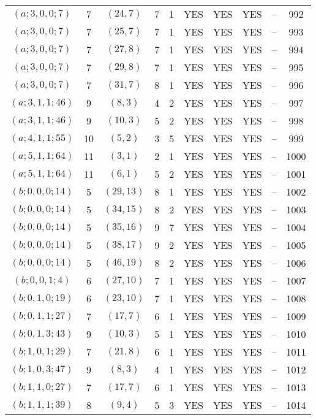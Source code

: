 \begin{longtable}{|c|c|c|c|c|c|c|c|c|c|}
$(a; 3, 0, 0; 7)$ & 7 & $(24, 7)$ & 7 & 1 & YES & YES & YES & -- & 992\\
$(a; 3, 0, 0; 7)$ & 7 & $(25, 7)$ & 7 & 1 & YES & YES & YES & -- & 993\\
$(a; 3, 0, 0; 7)$ & 7 & $(27, 8)$ & 7 & 1 & YES & YES & YES & -- & 994\\
$(a; 3, 0, 0; 7)$ & 7 & $(29, 8)$ & 7 & 1 & YES & YES & YES & -- & 995\\
$(a; 3, 0, 0; 7)$ & 7 & $(31, 7)$ & 8 & 1 & YES & YES & YES & -- & 996\\
$(a; 3, 1, 1; 46)$ & 9 & $(8, 3)$ & 4 & 2 & YES & YES & YES & -- & 997\\
$(a; 3, 1, 1; 46)$ & 9 & $(10, 3)$ & 5 & 2 & YES & YES & YES & -- & 998\\
$(a; 4, 1, 1; 55)$ & 10 & $(5, 2)$ & 3 & 5 & YES & YES & YES & -- & 999\\
$(a; 5, 1, 1; 64)$ & 11 & $(3, 1)$ & 2 & 1 & YES & YES & YES & -- & 1000\\
$(a; 5, 1, 1; 64)$ & 11 & $(6, 1)$ & 5 & 2 & YES & YES & YES & -- & 1001\\
$(b; 0, 0, 0; 14)$ & 5 & $(29, 13)$ & 8 & 1 & YES & YES & YES & -- & 1002\\
$(b; 0, 0, 0; 14)$ & 5 & $(34, 15)$ & 8 & 2 & YES & YES & YES & -- & 1003\\
$(b; 0, 0, 0; 14)$ & 5 & $(35, 16)$ & 9 & 7 & YES & YES & YES & -- & 1004\\
$(b; 0, 0, 0; 14)$ & 5 & $(38, 17)$ & 9 & 2 & YES & YES & YES & -- & 1005\\
$(b; 0, 0, 0; 14)$ & 5 & $(46, 19)$ & 8 & 2 & YES & YES & YES & -- & 1006\\
$(b; 0, 0, 1; 4)$ & 6 & $(27, 10)$ & 7 & 1 & YES & YES & YES & -- & 1007\\
$(b; 0, 1, 0; 19)$ & 6 & $(23, 10)$ & 7 & 1 & YES & YES & YES & -- & 1008\\
$(b; 0, 1, 1; 27)$ & 7 & $(17, 7)$ & 6 & 1 & YES & YES & YES & -- & 1009\\
$(b; 0, 1, 3; 43)$ & 9 & $(10, 3)$ & 5 & 1 & YES & YES & YES & -- & 1010\\
$(b; 1, 0, 1; 29)$ & 7 & $(21, 8)$ & 6 & 1 & YES & YES & YES & -- & 1011\\
$(b; 1, 0, 3; 47)$ & 9 & $(8, 3)$ & 4 & 1 & YES & YES & YES & -- & 1012\\
$(b; 1, 1, 0; 27)$ & 7 & $(17, 7)$ & 6 & 1 & YES & YES & YES & -- & 1013\\
$(b; 1, 1, 1; 39)$ & 8 & $(9, 4)$ & 5 & 3 & YES & YES & YES & -- & 1014\\

\end{longtable}
